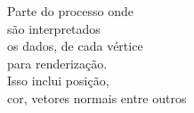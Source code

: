 \documentclass[preview]{standalone}
\begin{document}
Parte do processo onde\\são interpretados \\os dados, de cada vértice \\para renderização.\\Isso inclui posição,\\cor, vetores normais entre outros\\
\end{document}

